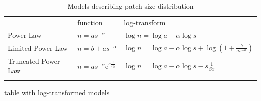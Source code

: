 \begin{table}[t!]
\label{tab:fitmodels}
\caption{ Models describing patch size distribution }
\centering
\begin{tabular}{lll}

\toprule
 & function & log-transform \\ \cmidrule(rl){2-2} \cmidrule(rl){3-3}
Power Law &  $n = a s^{- \alpha}$ & $ \log{n} =\log{a} - \alpha \log s$\\
Limited Power Law &  $n = b + a s^{- \alpha} $ & $ \log{n} = \log a - \alpha \log{s} + \log(1+\frac{b}{a s^{-\alpha} })$\\
Truncated Power Law & $n = a s^{- \alpha} \mathrm{e}^{s \frac{1}{S_x}}$  & $\log{n} = \log a  - \alpha  \log s  - s \frac{1}{Sx}  $ \\
	\bottomrule
\multicolumn{3}{p{12.5cm}}{\footnotesize  }
	\end{tabular}
\end{table}


table with log-transformed models


